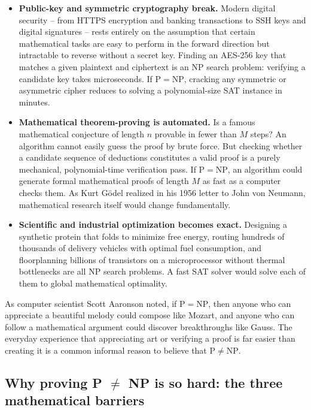 \begin{itemize}
  \item \textbf{Public-key and symmetric cryptography break.} Modern digital security -- from HTTPS encryption and banking transactions to SSH keys and digital signatures -- rests entirely on the assumption that certain mathematical tasks are easy to perform in the forward direction but intractable to reverse without a secret key. Finding an AES-256 key that matches a given plaintext and ciphertext is an $\mathrm{NP}$ search problem: verifying a candidate key takes microseconds. If $\mathrm{P} = \mathrm{NP}$, cracking any symmetric or asymmetric cipher reduces to solving a polynomial-size SAT instance in minutes.
  \item \textbf{Mathematical theorem-proving is automated.} Is a famous mathematical conjecture of length $n$ provable in fewer than $M$ steps? An algorithm cannot easily guess the proof by brute force. But checking whether a candidate sequence of deductions constitutes a valid proof is a purely mechanical, polynomial-time verification pass. If $\mathrm{P} = \mathrm{NP}$, an algorithm could generate formal mathematical proofs of length $M$ as fast as a computer checks them. As Kurt G\"odel realized in his 1956 letter to John von Neumann, mathematical research itself would change fundamentally.
  \item \textbf{Scientific and industrial optimization becomes exact.} Designing a synthetic protein that folds to minimize free energy, routing hundreds of thousands of delivery vehicles with optimal fuel consumption, and floorplanning billions of transistors on a microprocessor without thermal bottlenecks are all $\mathrm{NP}$ search problems. A fast SAT solver would solve each of them to global mathematical optimality.
\end{itemize}

As computer scientist Scott Aaronson noted, if $\mathrm{P} = \mathrm{NP}$, then anyone who can appreciate a beautiful melody could compose like Mozart, and anyone who can follow a mathematical argument could discover breakthroughs like Gauss. The everyday experience that appreciating art or verifying a proof is far easier than creating it is a common informal reason to believe that $\mathrm{P} \neq \mathrm{NP}$.

\subsection{Why proving P $\neq$ NP is so hard: the three mathematical barriers}

